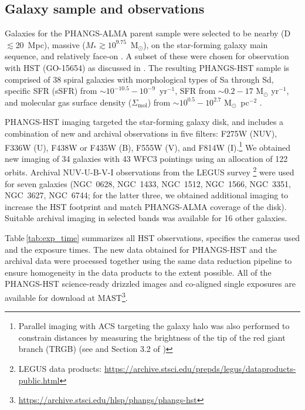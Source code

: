 \documentclass[linenumbers]{aastex63}
\newcommand{\msun}{M$_{\odot}$}
\newcommand{\sfr}{M$_{\odot}$ yr$^{-1}$}
\begin{document}


\subsection{Galaxy sample and observations}
Galaxies for the PHANGS-ALMA parent sample were selected to be nearby (D$\lesssim$20~Mpc), massive ($M_{*} \gtrsim 10^{9.75}$~\msun), on the star-forming galaxy main sequence, and relatively face-on \citep{leroy_phangs-alma_2021}.  A subset of these were chosen for observation with HST (GO-15654) as discussed in \citet{lee_phangs-hst_2022}. The resulting PHANGS-HST sample is comprised of 38 spiral galaxies with morphological types of Sa through Sd, specific SFR (sSFR) from ${\sim}10^{-10.5} {-} 10^{-9}$~yr$^{-1}$, SFR from ${\sim}0.2{-}17$ \sfr, and molecular gas surface density ($\Sigma_{\mbox{mol}}$) from ${\sim}10^{0.5}{-}10^{2.7}$ \msun~pc$^{-2}$ \citep[see ][Table 1 \& Figure 1]{lee_phangs-hst_2022}.

PHANGS-HST imaging targeted the star-forming galaxy disk, and includes a combination of new and archival observations in five filters: F275W (NUV), F336W (U), F438W or F435W (B), F555W (V), and F814W (I).\footnote{Parallel imaging with ACS targeting the galaxy halo was also performed to constrain distances by measuring the brightness of the tip of the red giant branch (TRGB) (see \citealt{anand_distances_2021} and Section 3.2 of \citealt{lee_phangs-hst_2022})} We obtained new imaging of 34 galaxies with 43 WFC3 pointings using an allocation of 122 orbits.  Archival NUV-U-B-V-I observations from the LEGUS survey \citep{calzetti_legacy_2015}\footnote{LEGUS data products: \url{https://archive.stsci.edu/prepds/legus/dataproducts-public.html}} were used for seven galaxies (NGC~0628, NGC~1433, NGC~1512, NGC~1566, NGC~3351, NGC~3627, NGC~6744; for the latter three, we obtained additional imaging to increase the HST footprint and match PHANGS-ALMA coverage of the disk).  Suitable archival imaging in selected bands was available for 16 other galaxies.

Table\,\ref{tab:exp_time} summarizes all HST observations, specifies the cameras used and the exposure times. The new data obtained for PHANGS-HST and the archival data were processed together using the same data reduction pipeline \citep[as summarized by][]{lee_phangs-hst_2022} to ensure homogeneity in the data products to the extent possible.  All of the PHANGS-HST science-ready drizzled images and co-aligned single exposures are available for download at MAST\footnote{\url{https://archive.stsci.edu/hlsp/phangs/phangs-hst}}. 
%

%
\end{document}
